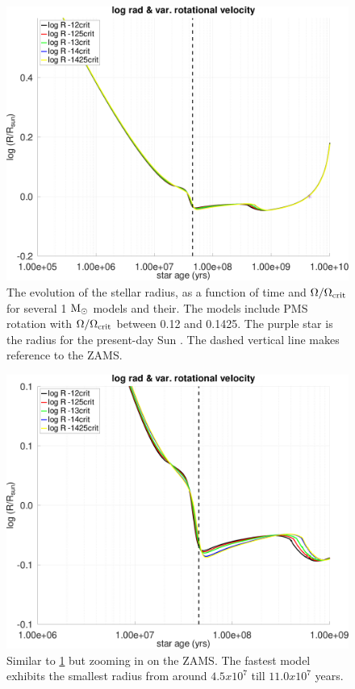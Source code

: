\documentclass[fleqn,usenatbib]{mnras}
\begin{document}
\begin{figure}
	\includegraphics[clip,width=\columnwidth]{figures/paper2/lograd_var_vel_g3.pdf}
    \caption{The evolution of the stellar radius, as a function of time and $\Omega / \Omega_{\mathrm{crit}}$ for several 1 $\mathrm{M}_\odot$ models and their. The models include PMS rotation with $\Omega / \Omega_{\mathrm{crit}}$ between 0.12 and 0.1425. The purple star is the radius for the present-day Sun \citep{Gill2012}. The dashed vertical line makes reference to the ZAMS.}
    \label{fig:lograd_var_vel_g3}
\end{figure}

\begin{figure}
	\includegraphics[clip,width=\columnwidth]{figures/paper2/lograd_var_vel_g_z13.pdf}
    \caption{Similar to \ref{fig:lograd_var_vel_g3} but zooming in on the ZAMS. The fastest model exhibits the smallest radius from around $4.5x10^{7}$ till $11.0x10^{7}$ years.}
    \label{fig:lograd_var_vel_g_z13}
\end{figure}
\end{document}
